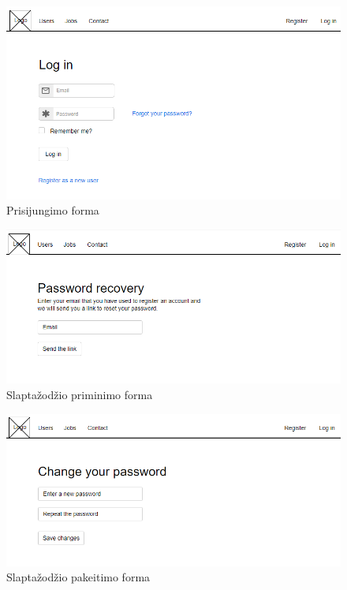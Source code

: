 \documentclass{VUMIFPSkursinis}
\begin{document}
\begin{figure}[H]
\centering
\includegraphics[width=\linewidth, frame]{img/logInForm.png}
\caption{Prisijungimo forma}
\end{figure}

\begin{figure}[H]
\centering
\includegraphics[width=\linewidth, frame]{img/passwordRecovery.png}
\caption{Slaptažodžio priminimo forma}
\end{figure}

\begin{figure}[H]
\centering
\includegraphics[width=\linewidth, frame]{img/passReset.png}
\caption{Slaptažodžio pakeitimo forma}
\end{figure}
\end{document}
